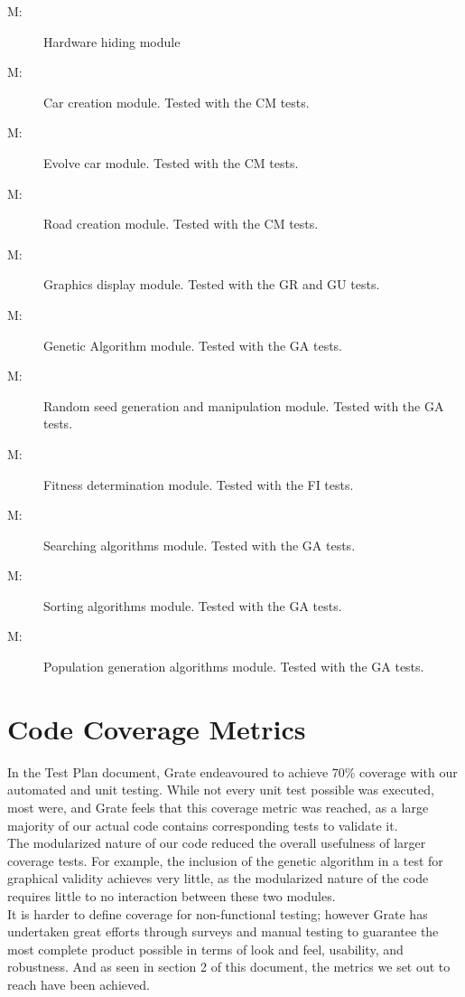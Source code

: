 \documentclass[12pt, titlepage]{article}
\newcounter{mnum}
\newcommand{\mthemnum}{M\themnum}
\begin{document}
\begin{description}
\item [ \mthemnum \label{mHardware}:] Hardware hiding 
module
\item [ \mthemnum \label{mCreateCar}:]  Car creation 
module. Tested with the CM tests.
\item [ \mthemnum \label{mEvolveCar}:] Evolve car module. 
Tested with the CM tests.
\item [ \mthemnum \label{mCreateRoad}:] Road creation 
module. Tested with the CM tests.
\item [ \mthemnum \label{mGraphicsDisplay}:] Graphics 
display module. Tested with the GR and GU tests.
\item [ \mthemnum \label{mGeneticAlgorithm}:] Genetic 
Algorithm module. Tested with the GA tests.
\item [ \mthemnum \label{mRandomSeed}:] Random seed 
generation and manipulation module. Tested with the GA tests.
\item [ \mthemnum \label{mFitness}:] Fitness determination 
module. Tested with the FI tests.
\item [ \mthemnum \label{mSearching}:] Searching algorithms 
module. Tested with the GA tests.
\item [ \mthemnum \label{mSorting}:] Sorting algorithms 
module. Tested with the GA tests.
\item [ \mthemnum \label{mPopulationGeneration}:] 
Population generation algorithms module. Tested with the GA tests.
\end{description}


\section{Code Coverage Metrics}

In the Test Plan document, Grate endeavoured to achieve 70\% coverage with our 
automated and unit testing. While not every unit test possible was executed, 
most were, and Grate feels that this coverage metric was reached, as a large 
majority of our actual code contains corresponding tests to validate it. \\

The modularized nature of our code reduced the overall usefulness of larger coverage 
tests. For example, the inclusion of the genetic algorithm in a test for 
graphical validity achieves very little, as the modularized nature of the code 
requires little to no interaction between these two modules.\\

It is harder to define coverage for non-functional testing; however Grate has undertaken great efforts through surveys and manual testing to guarantee the most complete product possible in terms of look and feel, usability, and robustness. And as seen in section 2 of this document,  the metrics we set out to reach have been achieved.
\end{document}
